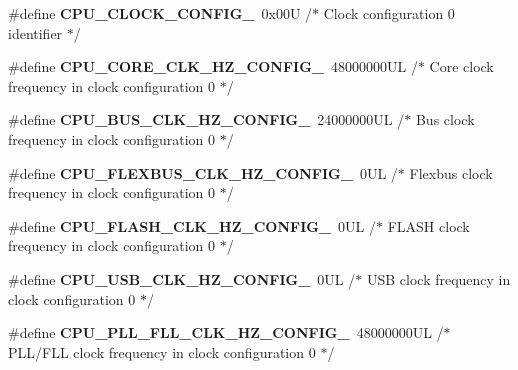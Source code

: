 \begin{DoxyCompactItemize}
\item 
\hypertarget{group___cpu__module_ga4d7ade6a1c335a7e5233938aa9197157}{\#define {\bfseries C\-P\-U\-\_\-\-C\-L\-O\-C\-K\-\_\-\-C\-O\-N\-F\-I\-G\-\_}~0x00\-U /$\ast$ Clock configuration 0 identifier $\ast$/}\label{group___cpu__module_ga4d7ade6a1c335a7e5233938aa9197157}

\item 
\hypertarget{group___cpu__module_ga6fe0b841d40421ee48af4a4e01e48ddf}{\#define {\bfseries C\-P\-U\-\_\-\-C\-O\-R\-E\-\_\-\-C\-L\-K\-\_\-\-H\-Z\-\_\-\-C\-O\-N\-F\-I\-G\-\_}~48000000\-U\-L /$\ast$ Core clock frequency in clock configuration 0 $\ast$/}\label{group___cpu__module_ga6fe0b841d40421ee48af4a4e01e48ddf}

\item 
\hypertarget{group___cpu__module_gaf060a047649b9537eb77354ab7917a8b}{\#define {\bfseries C\-P\-U\-\_\-\-B\-U\-S\-\_\-\-C\-L\-K\-\_\-\-H\-Z\-\_\-\-C\-O\-N\-F\-I\-G\-\_}~24000000\-U\-L /$\ast$ Bus clock frequency in clock configuration 0 $\ast$/}\label{group___cpu__module_gaf060a047649b9537eb77354ab7917a8b}

\item 
\hypertarget{group___cpu__module_ga706c0d4dd14c93181b7a99badddc9a51}{\#define {\bfseries C\-P\-U\-\_\-\-F\-L\-E\-X\-B\-U\-S\-\_\-\-C\-L\-K\-\_\-\-H\-Z\-\_\-\-C\-O\-N\-F\-I\-G\-\_}~0\-U\-L /$\ast$ Flexbus clock frequency in clock configuration 0 $\ast$/}\label{group___cpu__module_ga706c0d4dd14c93181b7a99badddc9a51}

\item 
\hypertarget{group___cpu__module_ga09c9820f38d931a0400b832d2582c6f7}{\#define {\bfseries C\-P\-U\-\_\-\-F\-L\-A\-S\-H\-\_\-\-C\-L\-K\-\_\-\-H\-Z\-\_\-\-C\-O\-N\-F\-I\-G\-\_}~0\-U\-L /$\ast$ F\-L\-A\-S\-H clock frequency in clock configuration 0 $\ast$/}\label{group___cpu__module_ga09c9820f38d931a0400b832d2582c6f7}

\item 
\hypertarget{group___cpu__module_ga7bf843fdf59af5fcaf48bea898884a3e}{\#define {\bfseries C\-P\-U\-\_\-\-U\-S\-B\-\_\-\-C\-L\-K\-\_\-\-H\-Z\-\_\-\-C\-O\-N\-F\-I\-G\-\_}~0\-U\-L /$\ast$ U\-S\-B clock frequency in clock configuration 0 $\ast$/}\label{group___cpu__module_ga7bf843fdf59af5fcaf48bea898884a3e}

\item 
\hypertarget{group___cpu__module_gad2aaa2918b640ae3833fc84e8f983c3c}{\#define {\bfseries C\-P\-U\-\_\-\-P\-L\-L\-\_\-\-F\-L\-L\-\_\-\-C\-L\-K\-\_\-\-H\-Z\-\_\-\-C\-O\-N\-F\-I\-G\-\_}~48000000\-U\-L /$\ast$ P\-L\-L/\-F\-L\-L clock frequency in clock configuration 0 $\ast$/}\label{group___cpu__module_gad2aaa2918b640ae3833fc84e8f983c3c}


\end{DoxyCompactItemize}
